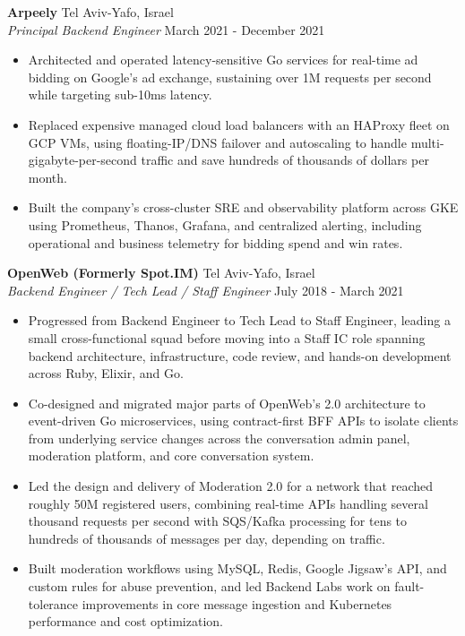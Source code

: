 \documentclass[a4paper]{article}
\begin{document}
\textbf{Arpeely} \hfill Tel Aviv-Yafo, Israel\\
\textit{Principal Backend Engineer} \hfill March 2021 - December 2021\\
\vspace{-1mm}
\begin{itemize} \itemsep 1pt
	\item Architected and operated latency-sensitive Go services for real-time ad bidding on Google's ad exchange, sustaining over 1M requests per second while targeting sub-10ms latency.
	\item Replaced expensive managed cloud load balancers with an HAProxy fleet on GCP VMs, using floating-IP/DNS failover and autoscaling to handle multi-gigabyte-per-second traffic and save hundreds of thousands of dollars per month.
	\item Built the company's cross-cluster SRE and observability platform across GKE using Prometheus, Thanos, Grafana, and centralized alerting, including operational and business telemetry for bidding spend and win rates.
\end{itemize}
\textbf{OpenWeb (Formerly Spot.IM)} \hfill Tel Aviv-Yafo, Israel\\
\textit{Backend Engineer / Tech Lead / Staff Engineer} \hfill July 2018 - March 2021\\
\vspace{-1mm}
\begin{itemize} \itemsep 1pt
	\item Progressed from Backend Engineer to Tech Lead to Staff Engineer, leading a small cross-functional squad before moving into a Staff IC role spanning backend architecture, infrastructure, code review, and hands-on development across Ruby, Elixir, and Go.
	\item Co-designed and migrated major parts of OpenWeb's 2.0 architecture to event-driven Go microservices, using contract-first BFF APIs to isolate clients from underlying service changes across the conversation admin panel, moderation platform, and core conversation system.
	\item Led the design and delivery of Moderation 2.0 for a network that reached roughly 50M registered users, combining real-time APIs handling several thousand requests per second with SQS/Kafka processing for tens to hundreds of thousands of messages per day, depending on traffic.
	\item Built moderation workflows using MySQL, Redis, Google Jigsaw's API, and custom rules for abuse prevention, and led Backend Labs work on fault-tolerance improvements in core message ingestion and Kubernetes performance and cost optimization.
\end{itemize}
\end{document}
